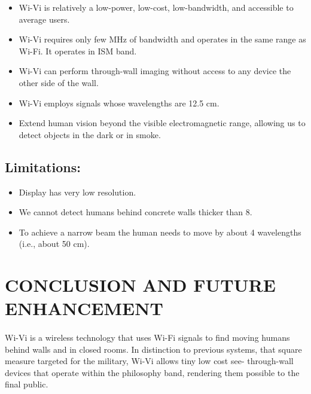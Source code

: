 \documentclass[a4paper,12pt,oneside]{article}
\begin{document}
\begin{itemize}
    \item Wi-Vi is relatively a low-power, low-cost, low-bandwidth, and accessible to average
users.
	\item Wi-Vi requires only few MHz of bandwidth and operates in the same range as Wi-Fi. It
operates in ISM band.
	\item Wi-Vi can perform through-wall imaging without access to any device the other side of
the wall.
	\item Wi-Vi employs signals whose wavelengths are 12.5 cm.
	\item Extend human vision beyond the visible electromagnetic range, allowing us to detect
objects in the dark or in smoke.
\end{itemize}

\subsection{Limitations:}

\begin{itemize}
    	\item Display has very low resolution.
	\item We cannot detect humans behind concrete walls thicker than 8.
	\item To achieve a narrow beam the human needs to move by about 4 wavelengths (i.e., about
50 cm).
\end{itemize}

\newpage
\section{CONCLUSION AND FUTURE ENHANCEMENT}
\paragraph{}
Wi-Vi is a wireless technology that uses Wi-Fi signals to find moving humans
behind walls and in closed rooms. In distinction to previous systems, that square measure
targeted for the military, Wi-Vi allows tiny low cost see- through-wall devices that operate within
the philosophy band, rendering them possible to the final public.
\end{document}
